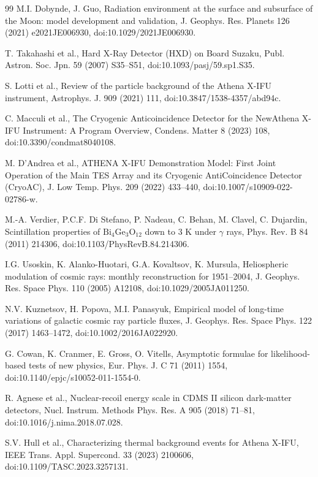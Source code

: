 \documentclass[11pt]{article}
\newcommand{\revblue}[1]{\textcolor{revisionblue}{#1}}
\begin{document}
\begin{thebibliography}{99}
M.I. Dobynde, J. Guo,
Radiation environment at the surface and subsurface of the Moon:
model development and validation,
J. Geophys. Res. Planets 126 (2021) e2021JE006930,
doi:10.1029/2021JE006930.

\revblue{T. Takahashi et al., Hard X-Ray Detector (HXD) on Board Suzaku,
Publ. Astron. Soc. Jpn. 59 (2007) S35--S51,
doi:10.1093/pasj/59.sp1.S35.}

S. Lotti et al.,
Review of the particle background of the Athena X-IFU instrument,
Astrophys. J. 909 (2021) 111,
doi:10.3847/1538-4357/abd94c.

\revblue{C. Macculi et al.,
The Cryogenic Anticoincidence Detector for the NewAthena X-IFU Instrument:
A Program Overview,
Condens. Matter 8 (2023) 108,
doi:10.3390/condmat8040108.}

\revblue{M. D'Andrea et al.,
ATHENA X-IFU Demonstration Model: First Joint Operation of the Main TES Array
and its Cryogenic AntiCoincidence Detector (CryoAC),
J. Low Temp. Phys. 209 (2022) 433--440,
doi:10.1007/s10909-022-02786-w.}

\revblue{M.-A. Verdier, P.C.F. Di Stefano, P. Nadeau, C. Behan, M. Clavel, C. Dujardin,
Scintillation properties of $\mathrm{Bi_4Ge_3O_{12}}$ down to 3 K under
$\gamma$ rays,
Phys. Rev. B 84 (2011) 214306,
doi:10.1103/PhysRevB.84.214306.}

I.G. Usoskin, K. Alanko-Huotari, G.A. Kovaltsov, K. Mursula,
Heliospheric modulation of cosmic rays: monthly reconstruction for 1951--2004,
J. Geophys. Res. Space Phys. 110 (2005) A12108,
doi:10.1029/2005JA011250.

N.V. Kuznetsov, H. Popova, M.I. Panasyuk,
Empirical model of long-time variations of galactic cosmic ray particle fluxes,
J. Geophys. Res. Space Phys. 122 (2017) 1463--1472,
doi:10.1002/2016JA022920.

G. Cowan, K. Cranmer, E. Gross, O. Vitells, Asymptotic formulae for likelihood-based tests of new physics, Eur. Phys. J. C 71 (2011) 1554, doi:10.1140/epjc/s10052-011-1554-0.

R. Agnese et al., Nuclear-recoil energy scale in CDMS II silicon dark-matter detectors, Nucl. Instrum. Methods Phys. Res. A 905 (2018) 71--81, doi:10.1016/j.nima.2018.07.028.

S.V. Hull et al., Characterizing thermal background events for Athena X-IFU, IEEE Trans. Appl. Supercond. 33 (2023) 2100606, doi:10.1109/TASC.2023.3257131.

\end{thebibliography}
\end{document}
